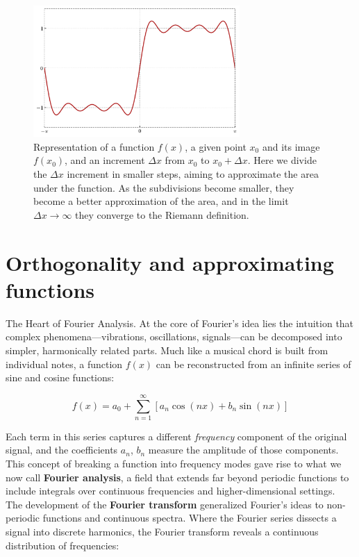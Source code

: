 \documentclass{book}
\begin{document}
\begin{figure}[ht]
    \centering
    \includegraphics[width=0.7\textwidth]{figures/appendix/fourier_series_3.png}
    \caption{Representation of a function $f(x)$, a given point $x_0$ and its image $f(x_0)$, and an increment $\Delta x$ from $x_0$ to $x_0 + \Delta x$. Here we divide the $\Delta x$ increment in smaller steps, aiming to approximate the area under the function. As the subdivisions become smaller, they become a better approximation of the area, and in the limit $\Delta x \rightarrow \infty$ they converge to the Riemann definition.}
    \label{fig:fourier_series_3}
\end{figure}

\section{Orthogonality and approximating functions}


The Heart of Fourier Analysis. At the core of Fourier’s idea lies the intuition that complex phenomena---vibrations, oscillations, signals---can be decomposed into simpler, harmonically related parts. Much like a musical chord is built from individual notes, a function $f(x)$ can be reconstructed from an infinite series of sine and cosine functions:

\[
f(x) = a_0 + \sum_{n=1}^{\infty} \left[ a_n \cos(nx) + b_n \sin(nx) \right]
\]

Each term in this series captures a different \emph{frequency} component of the original signal, and the coefficients $a_n$, $b_n$ measure the amplitude of those components. This concept of breaking a function into frequency modes gave rise to what we now call \textbf{Fourier analysis}, a field that extends far beyond periodic functions to include integrals over continuous frequencies and higher-dimensional settings.\\

The development of the \textbf{Fourier transform} generalized Fourier’s ideas to non-periodic functions and continuous spectra. Where the Fourier series dissects a signal into discrete harmonics, the Fourier transform reveals a continuous distribution of frequencies:
\end{document}
